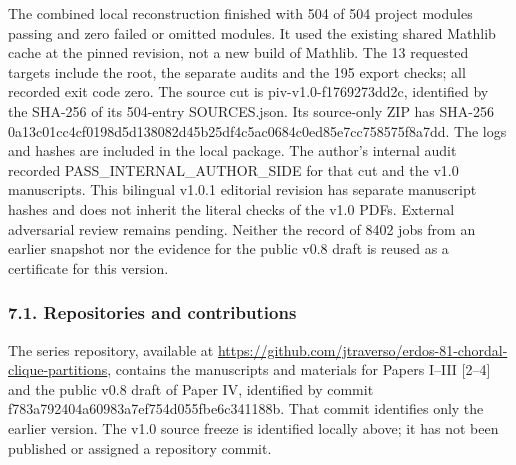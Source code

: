 \documentclass[english,11pt,a4paper]{article}
\begin{document}
The combined local reconstruction finished with 504 of 504 project modules passing and zero failed or omitted modules. It used the existing shared Mathlib cache at the pinned revision, not a new build of Mathlib. The 13 requested targets include the root, the separate audits and the 195 export checks; all recorded exit code zero. The source cut is {\ttfamily\small piv-\discretionary{\hbox{\ensuremath{\hookrightarrow}}}{}{}v1.\discretionary{\hbox{\ensuremath{\hookrightarrow}}}{}{}0-\discretionary{\hbox{\ensuremath{\hookrightarrow}}}{}{}f1769273dd2c}, identified by the SHA-256 of its 504-entry {\ttfamily\small SOURCES.\discretionary{\hbox{\ensuremath{\hookrightarrow}}}{}{}json}. Its source-only ZIP has SHA-256 {\ttfamily\small 0a13c01cc4cf\discretionary{\hbox{\ensuremath{\hookrightarrow}}}{}{}0198d5d13808\discretionary{\hbox{\ensuremath{\hookrightarrow}}}{}{}2d45b25df4c5\discretionary{\hbox{\ensuremath{\hookrightarrow}}}{}{}ac0684c0ed85\discretionary{\hbox{\ensuremath{\hookrightarrow}}}{}{}e7cc758575f8\discretionary{\hbox{\ensuremath{\hookrightarrow}}}{}{}a7dd}. The logs and hashes are included in the local package. The author's internal audit recorded {\ttfamily\small PASS\_\discretionary{\hbox{\ensuremath{\hookrightarrow}}}{}{}INTERNAL\_\discretionary{\hbox{\ensuremath{\hookrightarrow}}}{}{}AUTHOR\_\discretionary{\hbox{\ensuremath{\hookrightarrow}}}{}{}SIDE} for that cut and the v1.0 manuscripts. This bilingual v1.0.1 editorial revision has separate manuscript hashes and does not inherit the literal checks of the v1.0 PDFs. External adversarial review remains pending. Neither the record of 8402 jobs from an earlier snapshot nor the evidence for the public v0.8 draft is reused as a certificate for this version.

\subsubsection{7.1. Repositories and contributions}\label{repositories-and-contributions}

The series repository, available at \url{https://github.com/jtraverso/erdos-81-chordal-clique-partitions}, contains the manuscripts and materials for Papers I--III {[}2--4{]} and the public v0.8 draft of Paper IV, identified by commit {\ttfamily\small f783a792404a\discretionary{\hbox{\ensuremath{\hookrightarrow}}}{}{}60983a7ef754\discretionary{\hbox{\ensuremath{\hookrightarrow}}}{}{}d055fbe6c341\discretionary{\hbox{\ensuremath{\hookrightarrow}}}{}{}188b}. That commit identifies only the earlier version. The v1.0 source freeze is identified locally above; it has not been published or assigned a repository commit.
\end{document}
